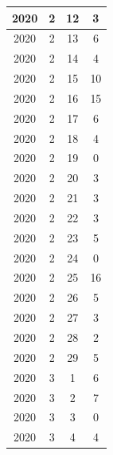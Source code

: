 \begin{longtable} {|c|c|c|c|}
\hline
2020         & 2            & 12           & 3                         \\ 
\hline
2020         & 2            & 13           & 6                         \\ 
\hline
2020         & 2            & 14           & 4                         \\ 
\hline
2020         & 2            & 15           & 10                        \\ 
\hline
2020         & 2            & 16           & 15                        \\ 
\hline
2020         & 2            & 17           & 6                         \\ 
\hline
2020         & 2            & 18           & 4                         \\ 
\hline
2020         & 2            & 19           & 0                         \\ 
\hline
2020         & 2            & 20           & 3                         \\ 
\hline
2020         & 2            & 21           & 3                         \\ 
\hline
2020         & 2            & 22           & 3                         \\ 
\hline
2020         & 2            & 23           & 5                         \\ 
\hline
2020         & 2            & 24           & 0                         \\ 
\hline
2020         & 2            & 25           & 16                        \\ 
\hline
2020         & 2            & 26           & 5                         \\ 
\hline
2020         & 2            & 27           & 3                         \\ 
\hline
2020         & 2            & 28           & 2                         \\ 
\hline
2020         & 2            & 29           & 5                         \\ 
\hline
2020         & 3            & 1            & 6                         \\ 
\hline
2020         & 3            & 2            & 7                         \\ 
\hline
2020         & 3            & 3            & 0                         \\ 
\hline
2020         & 3            & 4            & 4                         \\ 

\end{longtable}
